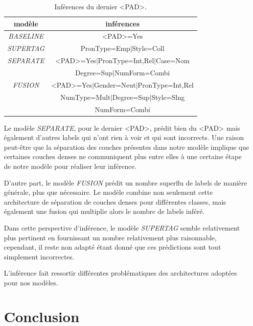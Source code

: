\documentclass[a4paper]{article}
\begin{document}
\begin{table}[H]
    \centering
    \begin{tabular}{|c|c|}
        \hline
        \textbf{modèle} & \textbf{inférences} \\
        \hline
        \textit{BASELINE} & <PAD>=Yes \\
        \hline
        \textit{SUPERTAG} & PronType=Emp$\mid$Style=Coll\\
        \hline
        \textit{SEPARATE} & <PAD>=Yes$\mid$PronType=Int,Rel$\mid$Case=Nom\\
            & Degree=Sup$\mid$NumForm=Combi\\
        \hline
        \textit{FUSION} & <PAD>=Yes$\mid$Gender=Neut$\mid$PronType=Int,Rel\\
            & NumType=Mult$\mid$Degree=Sup$\mid$Style=Slng\\
            & NumForm=Combi\\
        \hline
    \end{tabular}
    \caption{Inférences du dernier <PAD>.}
    \label{tab: lastpad}
\end{table} 

Le modèle \textit{SEPARATE}, pour le dernier <PAD>, prédit bien du <PAD> mais également d'autres 
labels qui n'ont rien à voir et qui sont incorrects. Une raison peut-être que la séparation des couches présentes dans notre modèle 
implique que certaines couches denses ne communiquent plus entre elles à une certaine étape de notre modèle pour réaliser leur 
inférence.

D'autre part, le modèle \textit{FUSION} prédit un nombre superflu de labels de manière générale, plus que nécessaire. Le modèle 
combine non seulement cette architecture de séparation de couches denses pour différentes classes, mais également une fusion qui multiplie alors le nombre de labels inféré. 

Dans cette perspective d'inférence, le modèle \textit{SUPERTAG} semble relativement plus pertinent en fournissant un nombre 
relativement plus raisonnable, cependant, il reste non adapté étant donné que ces prédictions sont tout simplement incorrectes. 

L'inférence fait ressortir différentes problématiques des architectures adoptées pour nos modèles.

\section{Conclusion}
\end{document}
